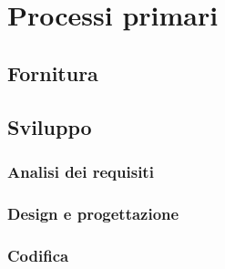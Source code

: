 \chapter{Processi primari}
\minitoc
\section{Fornitura}

\section{Sviluppo}

\subsection{Analisi dei requisiti}
\subsection{Design e progettazione}
\subsection{Codifica}
